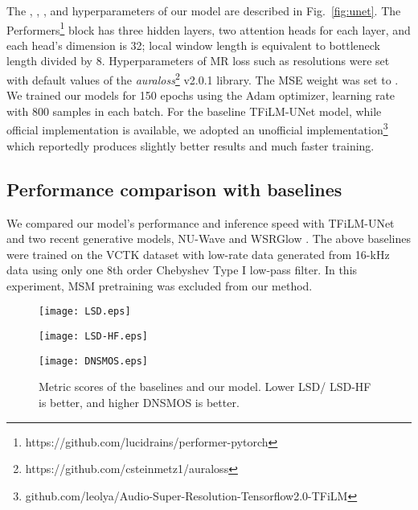 \documentclass{article}
\begin{document}
The , , , and  hyperparameters of our model are described in Fig.~\ref{fig:unet}. The Performers\footnote{https://github.com/lucidrains/performer-pytorch} block has three hidden layers, two attention heads for each layer, and each head's dimension is 32; local window length is equivalent to bottleneck length divided by 8. Hyperparameters of MR loss such as resolutions were set with default values of the \textit{auraloss}\footnote{https://github.com/csteinmetz1/auraloss} v2.0.1 library. The MSE weight was set to . We trained our models for 150 epochs using the Adam optimizer,  learning rate with 800 samples in each batch. For the baseline TFiLM-UNet model, while official implementation is available, we adopted an unofficial implementation\footnote{github.com/leolya/Audio-Super-Resolution-Tensorflow2.0-TFiLM} which reportedly produces slightly better results and much faster training. 
\vspace{-0.3cm}

\subsection{Performance comparison with baselines}
\vspace{-0.2cm}
\label{sec:per}
We compared our model's performance and inference speed with TFiLM-UNet and two recent generative models, NU-Wave \cite{nuwave} and WSRGlow \cite{wsrglow}. The above baselines were trained on the VCTK dataset with low-rate data generated from 16-kHz data using only one 8th order Chebyshev Type I low-pass filter. In this experiment, MSM pretraining was excluded from our method.
\begin{figure}
\centering
\begin{minipage}[b]{.48\linewidth}
  \raggedright
  \centerline{\texttt{[image: LSD.eps]}}
\end{minipage}


\begin{minipage}[b]{.48\linewidth}
  \raggedright
  \centerline{\texttt{[image: LSD-HF.eps]}}
\end{minipage}




\begin{minipage}[b]{.48\linewidth}
  \raggedright
  \centerline{\texttt{[image: DNSMOS.eps]}}
\end{minipage}
\caption{Metric scores of the baselines and our model. Lower LSD/ LSD-HF is better, and higher DNSMOS is better.}
\label{fig:scores}

\end{figure}
\end{document}
